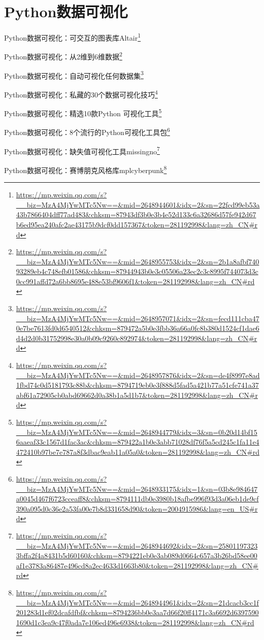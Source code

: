 \documentclass[]{ctexbook}
\renewcommand{\href}[2]{#2\footnote{\url{#1}}}
\begin{document}
\hypertarget{pythonux6570ux636eux53efux89c6ux5316}{%
\section{Python数据可视化}\label{pythonux6570ux636eux53efux89c6ux5316}}

\href{https://mp.weixin.qq.com/s?__biz=MzA4MjYwMTc5Nw==\&mid=2648944601\&idx=2\&sn=22fcd99eb53a43b7866404dff77ad483\&chksm=87943df3b0e3b4e52d133c6a32686d57fe942d67b6ed95ea240afc2ae43175b9dcf0dd157367\&token=281192998\&lang=zh_CN\#rd}{Python数据可视化：可交互的图表库Altair}

\href{https://mp.weixin.qq.com/s?__biz=MzA4MjYwMTc5Nw==\&mid=2648955753\&idx=2\&sn=2b1a8afbf74093289eb4c748efb01586\&chksm=87944943b0e3c05506a23ec2c3c8995f744073d3c0cc991affd72a6bb8695e488e53bf9606f1\&token=281192998\&lang=zh_CN\#rd}{Python数据可视化：从2维到6维数据}

\href{https://mp.weixin.qq.com/s?__biz=MzA4MjYwMTc5Nw==\&mid=2648957071\&idx=2\&sn=fecd111cba470e7be7613fd0d6540512\&chksm=879472a5b0e3fbb36a66a0fc8b380d1524cf1dae6d4d2d0b31752998e30a0b09c9260c892974\&token=281192998\&lang=zh_CN\#rd}{Python数据可视化：自动可视化任何数据集}

\href{https://mp.weixin.qq.com/s?__biz=MzA4MjYwMTc5Nw==\&mid=2648957876\&idx=2\&sn=de4f8997e8ad1fbd74c0d5181793c88b\&chksm=8794719eb0e3f888d5fad5a421b77a51cfe741a37abf61a72905cb0abd69662d0a38b1a5d1b7\&token=281192998\&lang=zh_CN\#rd}{Python数据可视化：私藏的30个数据可视化技巧}

\href{https://mp.weixin.qq.com/s?__biz=MzA4MjYwMTc5Nw==\&mid=2648944779\&idx=3\&sn=0b20d14bf156aaeaf33c1567d1fac3ac\&chksm=879422a1b0e3abb71028df76f5a5cd245c1fa11e4472410b97be7e787a8f3dbac9eab11a05a0\&token=281192998\&lang=zh_CN\#rd}{Python数据可视化：精选10款Python 可视化工具}

\href{https://mp.weixin.qq.com/s?__biz=MzA4MjYwMTc5Nw==\&mid=2648933175\&idx=1\&sn=03b8e984647a0045d467f6723cceaff8\&chksm=8794111db0e3980b18afbe996f93d3a06eb1de9cf390a095d0c36e2a53fa00e7b8d331658d90\&token=2004915986\&lang=en_US\#rd}{Python数据可视化：8个流行的Python可视化工具包}

\href{https://mp.weixin.qq.com/s?__biz=MzA4MjYwMTc5Nw==\&mid=2648944692\&idx=2\&sn=258011973233bffa2f4a8431b5d60160\&chksm=8794221eb0e3ab089d0664c657a3b26bd58ee00af1e3783a86487e496cd8a2ec4633d1663b80\&token=281192998\&lang=zh_CN\#rd}{Python数据可视化：缺失值可视化工具missingno}

\href{https://mp.weixin.qq.com/s?__biz=MzA4MjYwMTc5Nw==\&mid=2648944961\&idx=2\&sn=21dcacb3cc1f201283d1ef02dcafdfbf\&chksm=8794236bb0e3aa7d66f20ff4171c3a6692d63975901690d1c3ea9c47f0ada7e106ed496e6938\&token=281192998\&lang=zh_CN\#rd}{Python数据可视化：赛博朋克风格库mplcyberpunk}
\end{document}

